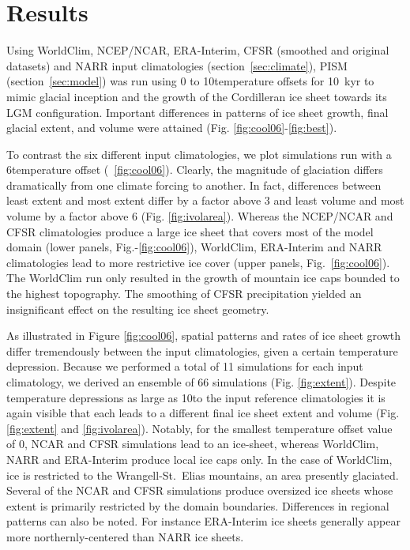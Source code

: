 \section{Results}
\label{sec:results}

Using WorldClim, NCEP/NCAR, ERA-Interim, CFSR (smoothed and original datasets) and NARR input climatologies (section~\ref{sec:climate}), PISM (section~\ref{sec:model}) was run using 0 to 10\degC  temperature offsets for 10~kyr to mimic glacial inception and the growth of the Cordilleran ice sheet towards its LGM configuration. Important differences in patterns of ice sheet growth, final glacial extent, and volume were attained (Fig. \ref{fig:cool06}-\ref{fig:best}).

To contrast the six different input climatologies, we plot simulations run with a 6\degC temperature offset (~\ref{fig:cool06}). Clearly, the magnitude of glaciation differs dramatically from one climate forcing to another. In fact, differences between least extent and most extent differ by a factor above 3 and least volume and most volume by a factor above 6 (Fig. \ref{fig:ivolarea}). Whereas the NCEP/NCAR and CFSR climatologies produce a large ice sheet that covers most of the model domain (lower panels, Fig.-\ref{fig:cool06}), WorldClim, ERA-Interim and NARR climatologies lead to more restrictive ice cover (upper panels, Fig.~\ref{fig:cool06}). The WorldClim run only resulted in the growth of mountain ice caps bounded to the highest topography. The smoothing of CFSR precipitation yielded an insignificant effect on the resulting ice sheet geometry.

As illustrated in Figure \ref{fig:cool06}, spatial patterns and rates of ice sheet growth differ tremendously between the input climatologies, given a certain temperature depression. Because we performed a total of 11 simulations for each input climatology, we derived an ensemble of 66 simulations (Fig. \ref{fig:extent}). Despite temperature depressions as large as 10\degC to the input reference climatologies it is again visible that each leads to a different final ice sheet extent and volume (Fig. \ref{fig:extent} and \ref{fig:ivolarea}). Notably, for the smallest temperature offset value of 0\degC, NCAR and CFSR simulations lead to an ice-sheet, whereas WorldClim, NARR and ERA-Interim produce local ice caps only. In the case of WorldClim, ice is restricted to the Wrangell-St.~Elias mountains, an area presently glaciated. Several of the NCAR and CFSR simulations produce oversized ice sheets whose extent is primarily restricted by the domain boundaries. Differences in regional patterns can also be noted. For instance ERA-Interim ice sheets generally appear more northernly-centered than NARR ice sheets.


